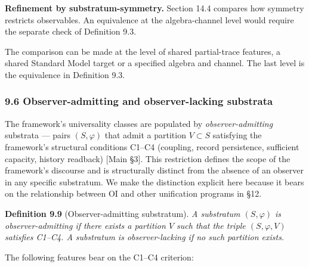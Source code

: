\documentclass[
]{article}
\begin{document}
\textbf{Refinement by substratum-symmetry.} Section 14.4 compares how
symmetry restricts observables. An equivalence at the algebra-channel
level would require the separate check of Definition 9.3.

The comparison can be made at the level of shared partial-trace
features, a shared Standard Model target or a specified algebra and
channel. The last level is the equivalence in Definition 9.3.

\hypertarget{observer-admitting-and-observer-lacking-substrata}{%
\subsubsection{9.6 Observer-admitting and observer-lacking
substrata}\label{observer-admitting-and-observer-lacking-substrata}}

The framework's universality classes are populated by
\emph{observer-admitting} substrata --- pairs \((S, \varphi)\) that
admit a partition \(V \subset S\) satisfying the framework's structural
conditions C1--C4 (coupling, record persistence, sufficient capacity,
history readback) {[}Main §3{]}. This restriction defines the scope of
the framework's discourse and is structurally distinct from the absence
of an observer in any specific substratum. We make the distinction
explicit here because it bears on the relationship between OI and other
unification programs in §12.

\textbf{Definition 9.9} (Observer-admitting substratum). \emph{A
substratum \((S, \varphi)\) is observer-admitting if there exists a
partition \(V\) such that the triple \((S, \varphi, V)\) satisfies
C1--C4. A substratum is observer-lacking if no such partition exists.}

The following features bear on the C1--C4 criterion:
\end{document}
